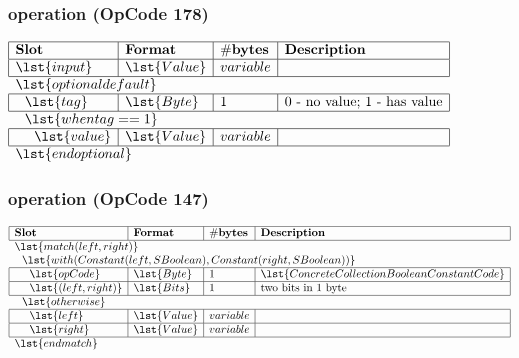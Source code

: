 \subsubsection{ operation (OpCode 178)}

\noindent
\(\begin{array}{| l | l | l | l |}
    \hline
    \bf{Slot} & \bf{Format} & \bf{\#bytes} & \bf{Description} \\
    \hline
    \lst{input} & \lst{Value} & variable &  \\
    \hline
    \multicolumn{4}{l}{\lst{optional default}} \\
    \hline
    ~~\lst{tag} & \lst{Byte} & 1 & \text{0 - no value; 1 - has value} \\
    \hline
    \multicolumn{4}{l}{~~\lst{when tag == 1}} \\
    \hline
    ~~~~\lst{value} & \lst{Value} & variable &  \\
    \hline
    \multicolumn{4}{l}{\lst{end optional}} \\
 \end{array}\)


\subsubsection{ operation (OpCode 147)}

\noindent
\(\begin{array}{| l | l | l | l |}
    \hline
    \bf{Slot} & \bf{Format} & \bf{\#bytes} & \bf{Description} \\
    \hline
    \multicolumn{4}{l}{\lst{match (left, right)}} \\
    \multicolumn{4}{l}{~~\lst{with (Constant(left, SBoolean), Constant(right, SBoolean))}} \\
    \hline
    ~~~~\lst{opCode} & \lst{Byte} & 1 & \lst{ConcreteCollectionBooleanConstantCode}  \\
    \hline
    ~~~~\lst{(left,right)} & \lst{Bits} & 1 & \text{two bits in 1 byte} \\
    \hline
    \multicolumn{4}{l}{~~\lst{otherwise}} \\
    \hline
    ~~~~\lst{left} & \lst{Value} & variable &  \\
    \hline
    ~~~~\lst{right} & \lst{Value} & variable &  \\
    \hline
    \multicolumn{4}{l}{\lst{end match}} \\
 \end{array}\)

